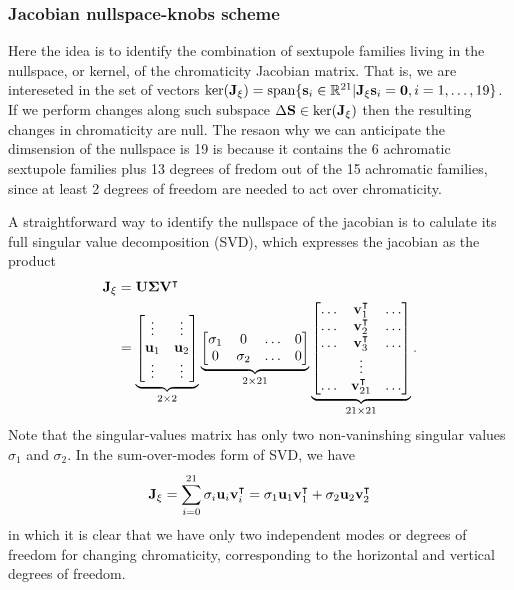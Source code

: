 \subsubsection{Jacobian nullspace-knobs scheme}
\label{subsubsec:nullspace}
Here the idea is to identify the combination of sextupole families living in the nullspace, or kernel, of the chromaticity Jacobian matrix. That is, we are intereseted in the set of vectors $\text{ker}(\vb{J}_\xi)=\text{span}\{\vb{s}_i\in\mathbb{R}^{21}| \vb{J}_{\xi} \vb{s}_i = \vb{0}, i=1,\dots,19 \}$. If we perform changes along such subspace $\Delta \vb{S}\in\text{ker}(\vb{J}_\xi)$ then the resulting changes in chromaticity are null. The resaon why we can anticipate the dimsension of the nullspace is 19 is because it contains the 6 achromatic sextupole families plus 13 degrees of fredom out of the 15 achromatic families, since at least 2 degrees of freedom are needed to act over chromaticity.

A straightforward way to identify the nullspace of the jacobian is to calulate its full singular value decomposition (SVD), which expresses the jacobian as the product
\begin{equation}
    \begin{aligned}
        \vb{J}_\xi &= \vb{U}\boldsymbol{\Sigma}\vb{V}^\intercal\\
                   &= \underbrace{\mqty[\vdots & \vdots \\
                            \vb{u}_1 & \vb{u}_2\\
                            \vdots & \vdots]}_{2\times 2}
                            \underbrace{\mqty[\sigma_1 & 0 & \dots & 0\\
                                             0 & \sigma_2 & \dots & 0 ]}_{2\times21}
                            \underbrace{\mqty[
                                \dots & \vb{v}^\intercal_1 & \dots\\
                                \dots & \vb{v}^\intercal_2 & \dots\\
                                \dots & \vb{v}^\intercal_3 & \dots\\
                                      & \vdots &    \\
                                \dots & \vb{v}^\intercal_{21} & \dots\\                              ]}_{21\times21}.
    \end{aligned}
\end{equation}
Note that the singular-values matrix has only two non-vaninshing singular values $\sigma_1$ and $\sigma_2$. In the sum-over-modes form of SVD, we have
\begin{equation}
    \vb{J}_\xi = \sum_{i=0}^{21}\sigma_i\vb{u}_i\vb{v}_{i}^{\intercal} = \sigma_1 \vb{u}_1\vb{v}_{1}^\intercal + \sigma_2 \vb{u}_2\vb{v}_{2}^\intercal
\end{equation}
in which it is clear that we have only two independent modes or degrees of freedom for changing chromaticity, corresponding to the horizontal and vertical degrees of freedom.

